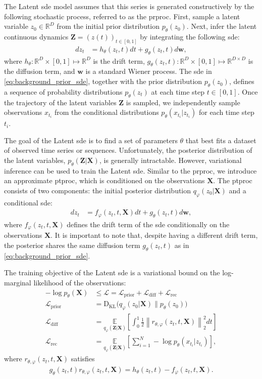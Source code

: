 \documentclass{article}
\def\E{\mathbb{E}}
\def\R{\mathbb{R}}
\def\X{\mathbf{X}}
\def\Z{\mathbf{Z}}
\def\w{\mathbf{w}}
\def\ph{\varphi}
\def\th{\theta}
\def\KL{{\mathrm{D}_\mathrm{KL}}}
\def\L{\mathcal{L}}
\def\Lrec{{\L_\mathrm{rec}}}
\def\Ldiff{{\L_\mathrm{diff}}}
\def\Lprior{{\L_\mathrm{prior}}}
\theoremstyle{plain}
\theoremstyle{definition}
\theoremstyle{remark}
\begin{document}
The Latent \gls{sde} model assumes that this series is generated constructively by the following stochastic process, referred to as the \gls{prproc}. First, sample a latent variable ${z_0 \in \R^D}$ from the initial prior distribution $p_\th(z_0)$. Next, infer the latent continuous dynamics $\Z = {(z(t))}_{t \in [0, 1]}$ by integrating the following \gls{sde}: 
\begin{align}
    d z_t &= h_\th(z_t, t) d t + g_\th(z_t, t) d \w,
    \label{eq:background_prior_sde}
\end{align}
where $h_\th : \R^D \times [0, 1] \mapsto \R^D$ is the drift term, $g_\th(z_t, t): \R^D \times [0, 1] \mapsto \R^{D \times D}$ is the diffusion term, and $\w$ is a standard Wiener process. The \gls{sde} in \cref{eq:background_prior_sde}, together with the prior distribution $p_\th(z_0)$, defines a sequence of probability distributions $p_\th(z_t)$ at each time step $t \in [0, 1]$. Once the trajectory of the latent variables $\Z$ is sampled, we independently sample observations $x_{t_i}$ from the conditional distributions $p_\th(x_{t_i}|z_{t_i})$ for each time step $t_i$.


The goal of the Latent \gls{sde} is to find a set of parameters $\th$ that best fits a dataset of observed time series or sequences. Unfortunately, the posterior distribution of the latent variables, $p_\th(\Z | \X)$, is generally intractable. However, variational inference can be used to train the Latent \gls{sde}. Similar to the \gls{prproc}, we introduce an approximate \gls{ptproc}, which is conditioned on the observations $\X$. The \gls{ptproc} consists of two components: the initial posterior distribution $q_\ph(z_0|\X)$ and a conditional \gls{sde}: 
\begin{align}
    d z_t &= f_\ph(z_t, t, \X) d t + g_\th(z_t, t) d \w,
    \label{eq:background_posterior_sde}
\end{align}
where $f_\ph(z_t, t, \X)$ defines the drift term of the \gls{sde} conditionally on the observations $\X$. It is important to note that, despite having a different drift term, the posterior shares the same diffusion term $g_\th(z_t, t)$ as in \cref{eq:background_prior_sde}.


The training objective of the Latent \gls{sde} is a variational bound on the log-marginal likelihood of the observations: 
\begin{align}
    -\log p_\th(\X) & \leq \L = \Lprior + \Ldiff + \Lrec 
    \label{eq:background_loss} \\
    \Lprior & = \KL \big( q_\ph(z_0|\X) \| p_\th(z_0) \big) \\
    \Ldiff & = \underset{q_\ph(\Z|\X)}{\E} \left[ \int_0^1 \frac{1}{2} \left\| r_{\th,\ph}(z_t, t, \X) \right\|_2^2 dt \right] 
    \label{eq:background_l_diff} \\
    \Lrec & = \underset{q_\ph(\Z|\X)}{\E} \left[ \sum_{i = 1}^N - \log p_\th(x_{t_i}|z_{t_i}) \right],
\end{align}
where $r_{\th,\ph}(z_t, t, \X)$ satisfies
\begin{align}
    g_\th(z_t, t) r_{\th,\ph}(z_t, t, \X) = h_\th(z_t, t) -  f_\ph(z_t, t, \X).
\end{align}
\end{document}
